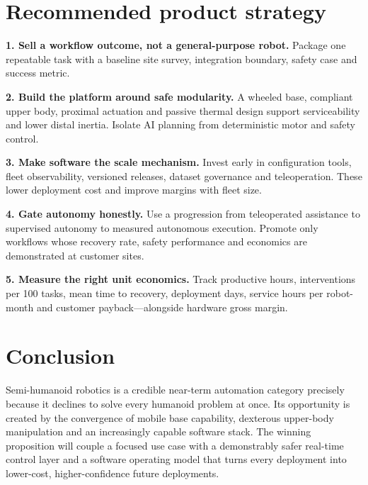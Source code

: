 \documentclass[11pt,a4paper]{article}
\begin{document}
\section{Recommended product strategy}

\textbf{1. Sell a workflow outcome, not a general-purpose robot.} Package one repeatable task with a baseline site survey, integration boundary, safety case and success metric.

\textbf{2. Build the platform around safe modularity.} A wheeled base, compliant upper body, proximal actuation and passive thermal design support serviceability and lower distal inertia. Isolate AI planning from deterministic motor and safety control.

\textbf{3. Make software the scale mechanism.} Invest early in configuration tools, fleet observability, versioned releases, dataset governance and teleoperation. These lower deployment cost and improve margins with fleet size.

\textbf{4. Gate autonomy honestly.} Use a progression from teleoperated assistance to supervised autonomy to measured autonomous execution. Promote only workflows whose recovery rate, safety performance and economics are demonstrated at customer sites.

\textbf{5. Measure the right unit economics.} Track productive hours, interventions per 100 tasks, mean time to recovery, deployment days, service hours per robot-month and customer payback---alongside hardware gross margin.

\section{Conclusion}

Semi-humanoid robotics is a credible near-term automation category precisely because it declines to solve every humanoid problem at once. Its opportunity is created by the convergence of mobile base capability, dexterous upper-body manipulation and an increasingly capable software stack. The winning proposition will couple a focused use case with a demonstrably safer real-time control layer and a software operating model that turns every deployment into lower-cost, higher-confidence future deployments.
\end{document}
